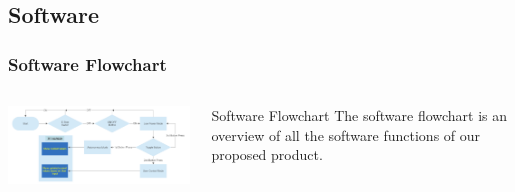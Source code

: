 \documentclass[aspectratio=169]{beamer}
\begin{document}
\subsection{Software}
\begin{frame}
    \frametitle{Software Flowchart}

    \begin{columns}
        \begin{column}{0.72\textwidth}
            \includegraphics[width=11cm]{Operation}
        \end{column}

        \begin{column}{0.28\textwidth}
            \begin{block}{Software Flowchart}
                The software flowchart is an overview of all the software functions of our
                proposed product.
            \end{block}
        \end{column}
    \end{columns}


\end{frame}
\end{document}
